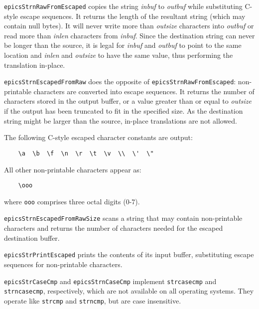 \verb|epicsStrnRawFromEscaped| copies the string \emph{inbuf} to \emph{outbuf} while substituting C-style escape sequences.
It returns the length of the resultant string (which may contain null bytes).
It will never write more than \emph{outsize} characters into \emph{outbuf} or read more than \emph{inlen} characters from \emph{inbuf}.
Since the destination string can never be longer than the source, it is legal for \emph{inbuf} and \emph{outbuf} to point to the same location and \emph{inlen} and \emph{outsize} to have the same value, thus performing the translation in-place.

\verb|epicsStrnEscapedFromRaw| does the opposite of \verb|epicsStrnRawFromEscaped|:
non-printable characters are converted into escape sequences.
It returns the number of characters stored in the output buffer, or a value greater than or equal to \emph{outsize} if the output has been truncated to fit in the specified size.
As the destination string might be larger than the source, in-place translations are not allowed.

The following C-style escaped character constants are output:

\begin{verbatim}
    \a  \b  \f  \n  \r  \t  \v  \\  \'  \"
\end{verbatim}

All other non-printable characters appear as:

\begin{verbatim}
    \ooo
\end{verbatim}

where \verb|ooo| comprises three octal digits (0-7).

\verb|epicsStrnEscapedFromRawSize| scans a string that may contain non-printable characters and returns the number of characters needed for the escaped destination buffer.

\verb|epicsStrPrintEscaped| prints the contents of its input buffer, substituting escape sequences for non-printable characters.

\verb|epicsStrCaseCmp| and \verb|epicsStrnCaseCmp| implement \verb|strcasecmp| and \verb|strncasecmp|, respectively, which are not available on all operating systems.
They operate like \verb|strcmp| and \verb|strncmp|, but are case insensitive.

